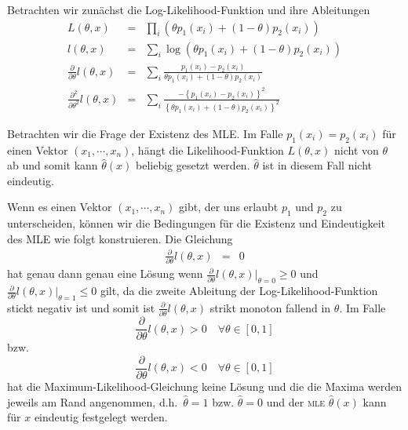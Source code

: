 \solution 
Betrachten wir zunächst die Log-Likelihood-Funktion und ihre Ableitungen
\begin{eqnarray}
	L(\theta, x) &=&  \prod_i \left( \theta p_1(x_i) + \left( 1-\theta \right)p_2(x_i) \right) \\
	l(\theta, x) &=& \sum_{i}^{} \log \left( \theta p_1(x_i) + \left( 1-\theta \right) p_2(x_i) \right) \\
	\frac{\partial}{\partial \theta} l(\theta,x) &=&  \sum_{i}^{} \frac{p_1(x_i)-p_2(x_i)}{\theta p_1(x_i) +\left( 1-\theta \right)p_2(x_i)} \\
	\frac{\partial^2}{\partial \theta^2} l(\theta,x) &=& \sum_{i}^{} \frac{ -\left\{ p_1(x_i)-p_2(x_i) \right\}^2 }{ \left\{ \theta p_1(x_i) +\left( 1-\theta \right)p_2(x_i) \right\}^2 }
\end{eqnarray}

Betrachten wir die Frage der Existenz des MLE. Im Falle $p_1(x_i)=p_2(x_i)$ für
einen Vektor $\left( x_1,\cdots,x_n \right)$, hängt die Likelihood-Funktion
$L\left( \theta ,x \right)$ nicht von $\theta$ ab und somit kann
$\hat\theta(x)$ beliebig gesetzt werden. $\hat\theta$ ist in diesem Fall nicht
eindeutig.

Wenn es einen Vektor $\left( x_1,\cdots,x_n \right)$ gibt, der uns erlaubt $p_1$ und $p_2$ zu unterscheiden,
können wir die Bedingungen für die Existenz und Eindeutigkeit des MLE wie folgt konstruieren. 
Die Gleichung
\begin{eqnarray}
	\frac{\partial}{\partial \theta} l(\theta,x) &=& 0
\end{eqnarray}
hat genau dann genau  eine Lösung wenn $ \frac{\partial}{\partial \theta} l(\theta,x)|_{\theta=0}\geq 0$ und
$ \frac{\partial}{\partial \theta} l(\theta,x)|_{\theta=1}\leq 0$ gilt, da die zweite Ableitung
der Log-Likelihood-Funktion stickt negativ ist und somit ist $ \frac{\partial}{\partial \theta} l(\theta,x)$ 
strikt monoton fallend in $\theta$.
Im Falle
\begin{equation}
	 \frac{\partial}{\partial \theta} l(\theta,x) > 0 \quad \forall \theta\in\left[ 0,1 \right]
\end{equation}
bzw.
\begin{equation}
	 \frac{\partial}{\partial \theta} l(\theta,x) < 0 \quad \forall \theta\in\left[ 0,1 \right]
\end{equation}
hat die Maximum-Likelihood-Gleichung keine Lösung und die
die Maxima werden jeweils am Rand angenommen, d.h.\ $\hat\theta=1$ bzw. $\hat\theta=0$ und 
der \textsc{mle} $\hat\theta(x)$ kann für $x$ eindeutig festgelegt werden.




